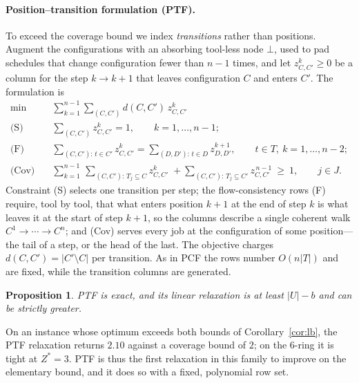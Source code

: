 \documentclass[11pt,a4paper]{article}
\theoremstyle{plain}
\newtheorem{proposition}{Proposition}
\theoremstyle{definition}
\theoremstyle{remark}
\newcommand{\U}{U}
\newcommand{\Zst}{Z^{\ast}}
\begin{document}
\paragraph{Position--transition formulation (PTF).}
To exceed the coverage bound we index \emph{transitions} rather than positions.
Augment the configurations with an absorbing tool-less node $\bot$, used to pad
schedules that change configuration fewer than $n-1$ times, and let $z_{C,C'}^{k}\ge
0$ be a column for the step $k\!\to\!k\!+\!1$ that leaves configuration $C$ and enters
$C'$. The formulation is
\[
\begin{aligned}
  \min\ & \sum_{k=1}^{n-1}\sum_{(C,C')} d(C,C')\,z_{C,C'}^{k}\\
  \text{(S)}\quad & \sum_{(C,C')} z_{C,C'}^{k}=1, \qquad k=1,\dots,n-1;\\
  \text{(F)}\quad & \sum_{(C,C'):\,t\in C'} z_{C,C'}^{k}
                    =\sum_{(D,D'):\,t\in D} z_{D,D'}^{k+1},
                    \qquad t\in T,\ k=1,\dots,n-2;\\
  \text{(Cov)}\quad & \sum_{k=1}^{n-1}\,\sum_{(C,C'):\,T_j\subseteq C} z_{C,C'}^{k}
                    \;+\!\!\sum_{(C,C'):\,T_j\subseteq C'} z_{C,C'}^{\,n-1}\ \ge\ 1,
                    \qquad j\in J.
\end{aligned}
\]
Constraint (S) selects one transition per step; the flow-consistency rows (F)
require, tool by tool, that what enters position $k\!+\!1$ at the end of step $k$ is
what leaves it at the start of step $k\!+\!1$, so the columns describe a single
coherent walk $C^{1}\!\to\!\cdots\!\to\!C^{n}$; and (Cov) serves every job at the
configuration of some position---the tail of a step, or the head of the last. The
objective charges $d(C,C')=\lvert C'\setminus C\rvert$ per transition. As in PCF the
rows number $O(n\lvert T\rvert)$ and are fixed, while the transition columns are
generated.
\begin{proposition}\label{prop:ptf}
PTF is exact, and its linear relaxation is at least $\lvert\U\rvert-b$ and can be
strictly greater.
\end{proposition}
\noindent On an instance whose optimum exceeds both bounds of
Corollary~\ref{cor:lb}, the PTF relaxation returns $2.10$ against a coverage bound of
$2$; on the $6$-ring it is tight at $\Zst=3$. PTF is thus the
first relaxation in this family to improve on the elementary bound, and it does so
with a fixed, polynomial row set.
\end{document}
